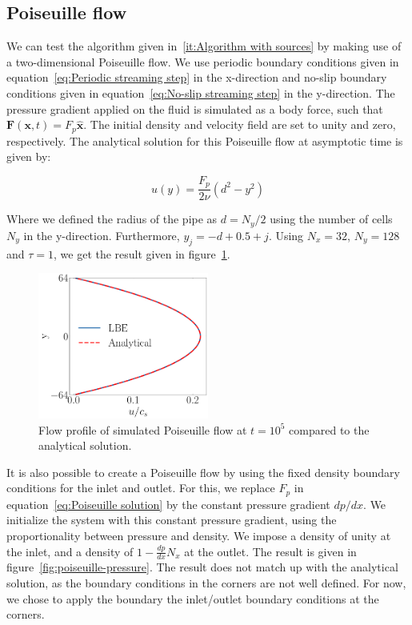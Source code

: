 \subsection{Poiseuille flow}
We can test the algorithm given in~\ref{it:Algorithm with sources} by making use of a two-dimensional Poiseuille flow. We use periodic boundary conditions given in equation~\ref{eq:Periodic streaming step} in the x-direction and no-slip boundary conditions given in equation~\ref{eq:No-slip streaming step} in the y-direction. The pressure gradient applied on the fluid is simulated as a body force, such that $\bm{F}(\bm{x}, t) = F_p \hat{\bm{x}}$. The initial density and velocity field are set to unity and zero, respectively. The analytical solution for this Poiseuille flow at asymptotic time is given by:

\begin{equation}\label{eq:Poiseuille solution}
    u(y) = \frac{F_p}{2 \nu} \left( d^2 - y^2 \right)
\end{equation}

Where we defined the radius of the pipe as $d = N_y/2$ using the number of cells $N_y$ in the y-direction. Furthermore, $y_j = -d + 0.5 + j$. Using $N_x = 32$, $N_y = 128$ and $\tau = 1$, we get the result given in figure~\ref{fig:poiseuille}.

\begin{figure}[htp]
    \centering
    \includegraphics[width=0.5\textwidth]{figures/poiseuille.pdf}
    \caption{Flow profile of simulated Poiseuille flow at $t=10^5$ compared to the analytical solution.}\label{fig:poiseuille}
\end{figure}

It is also possible to create a Poiseuille flow by using the fixed density boundary conditions for the inlet and outlet. For this, we replace $F_p$ in equation~\ref{eq:Poiseuille solution} by the constant pressure gradient $dp/dx$. We initialize the system with this constant pressure gradient, using the proportionality between pressure and density. We impose a density of unity at the inlet, and a density of $1 - \frac{dp}{dx} N_x$ at the outlet. The result is given in figure~\ref{fig:poiseuille-pressure}. The result does not match up with the analytical solution, as the boundary conditions in the corners are not well defined. For now, we chose to apply the boundary the inlet/outlet boundary conditions at the corners. 

